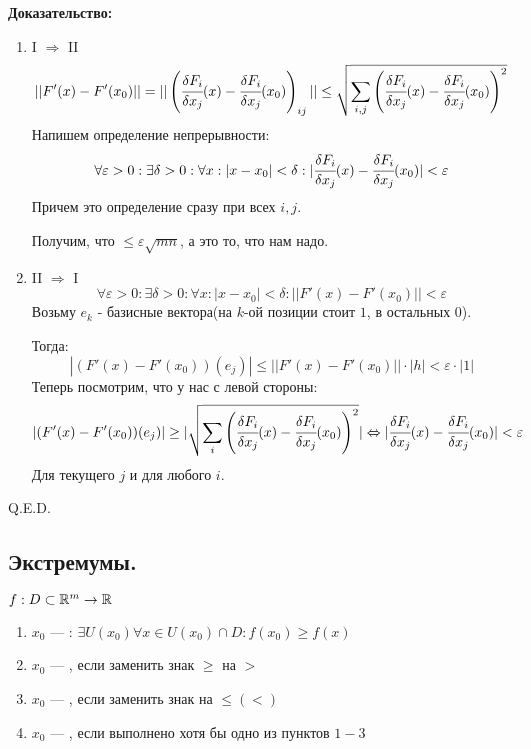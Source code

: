 \textbf{Доказательство:}
\begin{enumerate}
    \item I $\Rightarrow$ II
    $$||F'(x)-F'(x_0)|| = ||\left(\cfrac{\delta F_i}{\delta x_j}(x) - \cfrac{\delta F_i}{\delta x_j}(x_0)\right)_{ij}|| \leq \sqrt{\sum\limits_{i,j}\left( \cfrac{\delta F_i}{\delta x_j}(x) - \cfrac{\delta F_i}{\delta x_j}(x_0)   \right)^2}$$
    Напишем определение непрерывности:
    $$\forall \varepsilon >0: \exists \delta >0: \forall x : |x-x_0|<\delta: |\cfrac{\delta F_i}{\delta x_j}(x) - \cfrac{\delta F_i}{\delta x_j}(x_0)|<\varepsilon$$
    Причем это определение сразу при всех $i,j$.
    
    Получим, что $\leq \varepsilon\sqrt{mn}$, а это то, что нам надо.
    \item II $\Rightarrow$ I
$$\forall \varepsilon >0: \exists \delta > 0: \forall x: |x-x_0|<\delta: ||F'(x)-F'(x_0)||<\varepsilon$$
Возьму $e_k$ - базисные вектора(на $k$-ой позиции стоит $1$, в остальных $0$).

Тогда:
$$|(F'(x)-F'(x_0))(e_j)|\leq ||F'(x) - F'(x_0)||\cdot |h| < \varepsilon \cdot |1|$$
Теперь посмотрим, что у нас с левой стороны:
$$|(F'(x)-F'(x_0))(e_j)| \geq |\sqrt{\sum\limits_{i}\left(\cfrac{\delta F_i}{\delta x_j}(x)- \cfrac{\delta F_i}{\delta x_j}(x_0)\right)^2}|\Leftrightarrow |\cfrac{\delta F_i}{\delta x_j}(x)- \cfrac{\delta F_i}{\delta x_j}(x_0)|< \varepsilon $$
Для текущего $j$ и для любого $i$.


\end{enumerate}



\hfill Q.E.D.


\pagebreak

\subsection{Экстремумы.}

 $f: D \subset \mathbb{R}^m \rightarrow \mathbb{R}$
\begin{enumerate}
    \item $x_0$ --- : $\exists U(x_0) \forall x \in U(x_0)\cap D: f(x_0) \geq f(x)$
 \item  $x_0$ --- , если заменить  знак $\geq$ на $>$\
\item $x_0$ --- , если заменить знак на $\leq(<)$
\item  $x_0$ --- \deff{экстремум}, если выполнено хотя бы одно из пунктов $1-3$ 
\end{enumerate}


